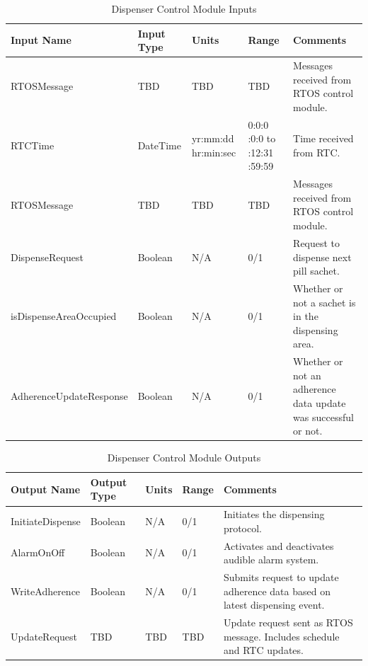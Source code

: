 \documentclass[12pt,titlepage]{article}
\begin{document}
\begin{table}[ht!]
\begin{center}
\begin{adjustbox}{max width=\textwidth}
\small
\begin{tabular}{|p{}|p{}|p{}|p{}|p{}|}
 \hline
 \textbf{Input Name} & \textbf{Input Type} & \textbf{Units} &\textbf{Range} & \textbf{Comments} \\
 \hline 
 RTOSMessage & TBD  & TBD & TBD & Messages received from RTOS control module. \\
 \hline
 RTCTime & DateTime  & yr:mm:dd \newline hr:min:sec & 0:0:0 \newline 0:0:0 to \newline 9999:12:31 \newline 23:59:59 & Time received from RTC. \\
 \hline
 RTOSMessage & TBD  & TBD & TBD & Messages received from RTOS control module. \\
 \hline
 DispenseRequest & Boolean  & N/A & 0/1 & Request to dispense next pill sachet. \\
 \hline
 isDispenseAreaOccupied & Boolean  & N/A & 0/1 & Whether or not a sachet is in the dispensing area. \\
 \hline
  AdherenceUpdateResponse & Boolean  & N/A & 0/1 & Whether or not an adherence data update was successful or not. \\
 \hline
\end{tabular}
\end{adjustbox}
\end{center}

\caption{Dispenser Control Module Inputs}
\end{table}

\begin{table}[ht!]
\begin{center}
\begin{adjustbox}{max width=\textwidth}
\small
\begin{tabular}{|p{}|p{}|p{}|p{}|p{}|}
 \hline
 \textbf{Output Name} & \textbf{Output Type} & \textbf{Units} &\textbf{Range} & \textbf{Comments} \\
 \hline 
 InitiateDispense & Boolean & N/A & 0/1 & Initiates the dispensing protocol. \\
 \hline
 AlarmOnOff & Boolean & N/A & 0/1 & Activates and deactivates audible alarm system. \\
 \hline
  WriteAdherence & Boolean & N/A & 0/1 & Submits request to update adherence data based on latest dispensing event. \\
 \hline
UpdateRequest & TBD & TBD & TBD & Update request sent as RTOS message. Includes schedule and RTC updates. \\
 \hline
\end{tabular}
\end{adjustbox}
\end{center}
\caption{Dispenser Control Module Outputs}
\end{table}
\end{document}
